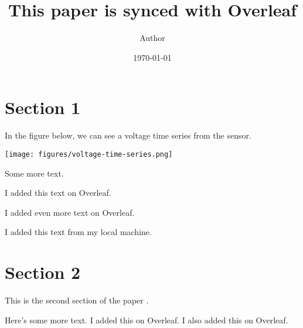 \documentclass[11pt]{article}
\title{This paper is synced with Overleaf}
\author{ Author }
\date{\today}
\begin{document}
\maketitle
\pagebreak



\section{Section 1}

In the figure below,
we can see a voltage time series from the sensor.

\texttt{[image: figures/voltage-time-series.png]}

Some more text.

I added this text on Overleaf.

I added even more text on Overleaf.

I added this text from my local machine.

\pagebreak
\section{Section 2}

This is the second section of the paper \cite{AbramowitzStegun1970}.

Here's some more text.
I added this on Overleaf.
I also added this on Overleaf.




\end{document}
